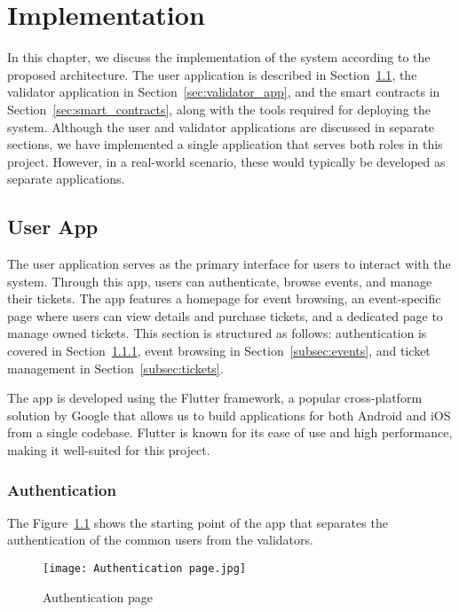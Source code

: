 \chapter{Implementation}\label{ch:implementation}

In this chapter, we discuss the implementation of the system according to the
proposed architecture. The user application is described in
Section~\ref{sec:user_app}, the validator application in
Section~\ref{sec:validator_app}, and the smart contracts in
Section~\ref{sec:smart_contracts}, along with the tools required for deploying
the system. Although the user and validator applications are discussed in
separate sections, we have implemented a single application that serves both
roles in this project. However, in a real-world scenario, these would typically
be developed as separate applications.

\section{User App}\label{sec:user_app}

The user application serves as the primary interface for users to interact with
the system. Through this app, users can authenticate, browse events, and manage
their tickets. The app features a homepage for event browsing, an
event-specific page where users can view details and purchase tickets, and a
dedicated page to manage owned tickets. This section is structured as follows:
authentication is covered in Section~\ref{subsec:authentication}, event
browsing in Section~\ref{subsec:events}, and ticket management in
Section~\ref{subsec:tickets}.

The app is developed using the Flutter framework, a popular cross-platform
solution by Google that allows us to build applications for both Android and
iOS from a single codebase. Flutter is known for its ease of use and high
performance, making it well-suited for this project.

\subsection{Authentication}\label{subsec:authentication}

The Figure~\ref{fig:authentication_page} shows the starting point of the app
that separates the authentication of the common users from the validators.

\begin{figure}[H]
	\centering
	\texttt{[image: Authentication page.jpg]}
	\caption{Authentication page}\label{fig:authentication_page}
\end{figure}

